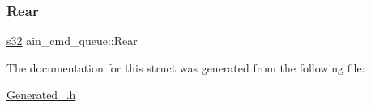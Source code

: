\mbox{\label{structain__cmd__queue_a0b83b0068468c6fd7d08089be0bc669f}} 
\subsubsection{\texorpdfstring{Rear}{Rear}}
{\footnotesize\ttfamily \hyperlink{ab__common_8h_ae9b1af5c037e57a98884758875d3a7c4}{s32} ain\+\_\+cmd\+\_\+queue\+::\+Rear}



The documentation for this struct was generated from the following file\+:\begin{DoxyCompactItemize}
\item 
\hyperlink{Generated__001_8h}{Generated\+\_.\+h}\end{DoxyCompactItemize}
